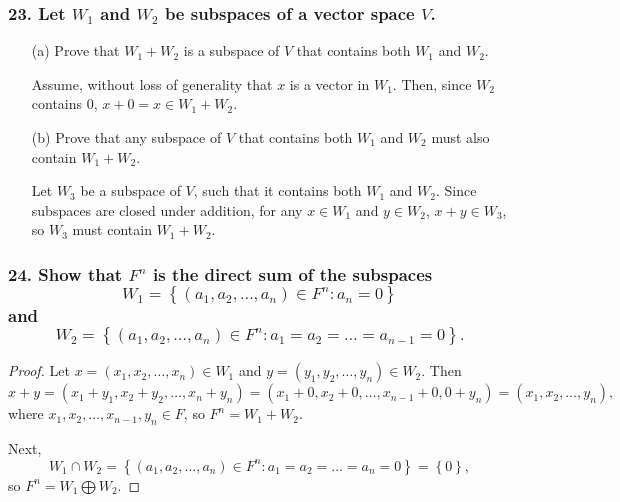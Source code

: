 \documentclass{article}
\begin{document}
\subsubsection*{23. Let $W_1$ and $W_2$ be subspaces of a vector space $V$.}
\begin{enumerate}
	\item[(a)] Prove that $W_1 + W_2$ is a subspace of $V$ that contains both $W_1$ and $W_2$.
	
	Assume, without loss of generality that $x$ is a vector in $W_1$. Then, since $W_2$ contains $0$, $x + 0 = x \in W_1 + W_2$.
	\item[(b)] Prove that any subspace of $V$ that contains both $W_1$ and $W_2$ must also contain $W_1 + W_2$.
	
	Let $W_3$ be a subspace of $V$, such that it contains both $W_1$ and $W_2$. Since subspaces are closed under addition, for any $x \in W_1$ and $y \in W_2$, $x + y \in W_3$, so $W_3$ must contain $W_1 + W_2$.
\end{enumerate}

\subsubsection*{24. Show that $F^n$ is the direct sum of the subspaces \[ W_1 = \left\{(a_1, a_2, \dots, a_n) \in F^n: a_n = 0\right\} \] and \[ W_2 = \left\{(a_1, a_2, \dots, a_n) \in F^n: a_1 = a_2 = \dots = a_{n-1} = 0\right\}. \]}
\begin{proof}
	Let $x = (x_1, x_2, \dots, x_n) \in W_1$ and $y = (y_1, y_2, \dots, y_n) \in W_2$. Then \[ x + y = (x_1 + y_1, x_2 + y_2, \dots, x_n + y_n) = (x_1 + 0, x_2 + 0, \dots, x_{n-1} + 0, 0 + y_n) = (x_1, x_2, \dots, y_n), \]
	where $x_1, x_2, \dots, x_{n-1}, y_n \in F$, so $F^n = W_1 + W_2$.

	Next, \[ W_1 \cap W_2 = \left\{(a_1, a_2, \dots, a_n) \in F^n: a_1 = a_2 = \dots = a_n = 0\right\} = \left\{0\right\},\] so $F^n = W_1 \bigoplus W_2$.
\end{proof}
\end{document}
